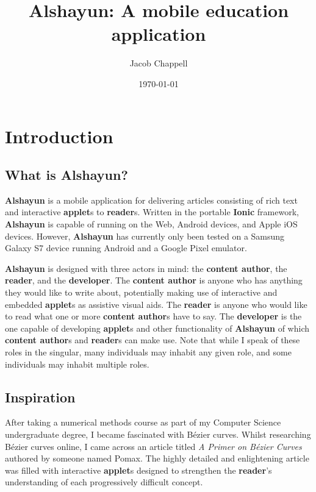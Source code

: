 \documentclass[12pt]{report}
\begin{document}
\title{Alshayun: A mobile education application}
\author{Jacob Chappell}
\date{\today}
\maketitle

\tableofcontents
\listoffigures


\chapter{Introduction}

    \section{What is Alshayun?}

\textbf{Alshayun} is a mobile application for delivering articles consisting of
rich text and interactive \textbf{applet}s to \textbf{reader}s. Written in the
portable \textbf{Ionic} framework, \textbf{Alshayun} is capable of running on
the Web, Android devices, and Apple iOS devices. However, \textbf{Alshayun} has
currently only been tested on a Samsung Galaxy S7 device running Android and a
Google Pixel emulator.

\textbf{Alshayun} is designed with three actors in mind: the \textbf{content
author}, the \textbf{reader}, and the \textbf{developer}. The \textbf{content
author} is anyone who has anything they would like to write about, potentially
making use of interactive and embedded \textbf{applet}s as assistive visual
aids. The \textbf{reader} is anyone who would like to read what one or more
\textbf{content author}s have to say. The \textbf{developer} is the one capable of
developing \textbf{applet}s and other functionality of \textbf{Alshayun} of
which \textbf{content author}s and \textbf{reader}s can make use. Note that
while I speak of these roles in the singular, many individuals may inhabit any
given role, and some individuals may inhabit multiple roles.

    \section{Inspiration}

After taking a numerical methods course as part of my Computer Science
undergraduate degree, I became fascinated with Bézier curves. Whilst researching
Bézier curves online, I came across an article titled \textit{A Primer on Bézier
Curves} \cite{pomax} authored by someone named Pomax. The highly detailed and
enlightening article was filled with interactive \textbf{applet}s designed to
strengthen the \textbf{reader}'s understanding of each progressively difficult
concept.
\end{document}
